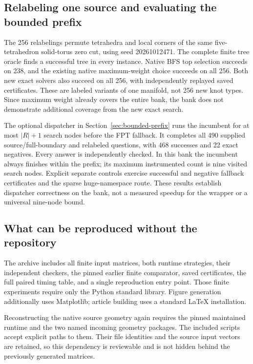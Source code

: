 \subsection{Relabeling one source and evaluating the bounded prefix}

The 256 relabelings permute tetrahedra and local corners of the same
five-tetrahedron solid-torus zero cut, using seed 20261012471. The complete
finite tree oracle finds a successful tree in every instance. Native BFS
top selection succeeds on 238, and the existing native maximum-weight
choice succeeds on all 256. Both new exact solvers also succeed on all
256, with independently replayed saved certificates. These are labeled
variants of one manifold, not 256 new knot types. Since maximum weight
already covers the entire bank, the bank does not demonstrate additional
coverage from the new exact search.

The optional dispatcher in Section~\ref{sec:bounded-prefix} runs the
incumbent for at most $|R|+1$ search nodes before the FPT fallback. It
completes all 490 supplied source/full-boundary and relabeled questions,
with 468 successes and 22 exact negatives. Every answer is independently
checked. In this bank the incumbent always finishes within the prefix;
its maximum instrumented count is nine visited search nodes. Explicit separate controls exercise successful and negative
fallback certificates and the sparse huge-namespace route. These results
establish dispatcher correctness on the bank, not a measured speedup for
the wrapper or a universal nine-node bound.

\subsection{What can be reproduced without the repository}

The archive includes all finite input matrices, both runtime strategies,
their independent checkers, the pinned earlier finite comparator, saved
certificates, the full paired timing table, and a single reproduction
entry point. Those finite experiments require only the Python standard
library. Figure generation additionally uses Matplotlib; article building
uses a standard \LaTeX{} installation.

Reconstructing the native source geometry again requires the pinned
maintained runtime and the two named incoming geometry packages. The
included scripts accept explicit paths to them. Their file identities
and the source input vectors are retained, so this dependency is
reviewable and is not hidden behind the previously generated matrices.
